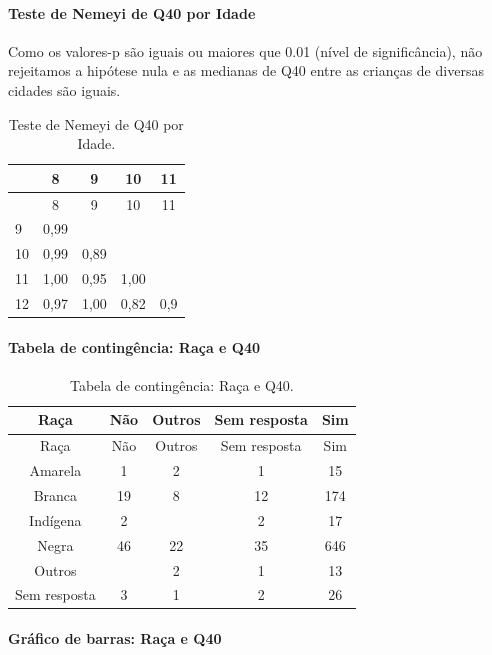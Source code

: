 \documentclass[]{article}
\let\oldparagraph\paragraph
\renewcommand{\paragraph}[1]{\oldparagraph{#1}\mbox{}}
\begin{document}
\hypertarget{teste-de-nemeyi-de-q40-por-idade}{%
\paragraph{Teste de Nemeyi de Q40 por Idade}\label{teste-de-nemeyi-de-q40-por-idade}}

Como os valores-p são iguais ou maiores que 0.01 (nível de significância), não rejeitamos a hipótese nula e as medianas de Q40 entre as crianças de diversas cidades são iguais.

\begin{longtable}[]{@{}lcccc@{}}
\caption{\label{tab:unnamed-chunk-1575}Teste de Nemeyi de Q40 por Idade.}\tabularnewline
\toprule
& 8 & 9 & 10 & 11\tabularnewline
\midrule
\endfirsthead
\toprule
& 8 & 9 & 10 & 11\tabularnewline
\midrule
\endhead
9 & 0,99 & & &\tabularnewline
10 & 0,99 & 0,89 & &\tabularnewline
11 & 1,00 & 0,95 & 1,00 &\tabularnewline
12 & 0,97 & 1,00 & 0,82 & 0,9\tabularnewline
\bottomrule
\end{longtable}

\cleardoublepage

\hypertarget{tabela-de-continguxeancia-rauxe7a-e-q40}{%
\paragraph{Tabela de contingência: Raça e Q40}\label{tabela-de-continguxeancia-rauxe7a-e-q40}}

\begin{longtable}[]{@{}ccccc@{}}
\caption{\label{tab:unnamed-chunk-1576}Tabela de contingência: Raça e Q40.}\tabularnewline
\toprule
Raça & Não & Outros & Sem resposta & Sim\tabularnewline
\midrule
\endfirsthead
\toprule
Raça & Não & Outros & Sem resposta & Sim\tabularnewline
\midrule
\endhead
Amarela & 1 & 2 & 1 & 15\tabularnewline
Branca & 19 & 8 & 12 & 174\tabularnewline
Indígena & 2 & & 2 & 17\tabularnewline
Negra & 46 & 22 & 35 & 646\tabularnewline
Outros & & 2 & 1 & 13\tabularnewline
Sem resposta & 3 & 1 & 2 & 26\tabularnewline
\bottomrule
\end{longtable}

\hypertarget{gruxe1fico-de-barras-rauxe7a-e-q40}{%
\paragraph{Gráfico de barras: Raça e Q40}\label{gruxe1fico-de-barras-rauxe7a-e-q40}}
\end{document}

